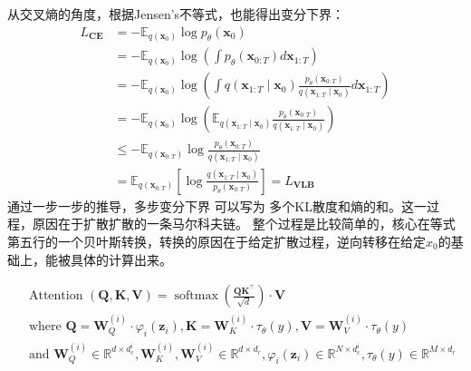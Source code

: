 从交叉熵的角度，根据Jensen's不等式，也能得出变分下界：
\begin{equation}
  \begin{aligned} L_{\mathbf{CE}}
    & =-\mathbb{E}_{q\left(\mathbf{x}_0\right)} \log p_\theta\left(\mathbf{x}_0\right) \\
    & =-\mathbb{E}_{q\left(\mathbf{x}_0\right)} \log \left(\int p_\theta\left(\mathbf{x}_{0: T}\right) d \mathbf{x}_{1: T}\right) \\
    & =-\mathbb{E}_{q\left(\mathbf{x}_0\right)} \log \left(\int q\left(\mathbf{x}_{1: T} \mid \mathbf{x}_0\right) \frac{p_\theta\left(\mathbf{x}_{0: T}\right)}{q\left(\mathbf{x}_{1: T} \mid \mathbf{x}_0\right)} d \mathbf{x}_{1: T}\right) \\
    & =-\mathbb{E}_{q\left(\mathbf{x}_0\right)} \log \left(\mathbb{E}_{q\left(\mathbf{x}_{1: T} \mid \mathbf{x}_0\right)} \frac{p_\theta\left(\mathbf{x}_{0: T}\right)}{q\left(\mathbf{x}_{1: T} \mid \mathbf{x}_0\right)}\right) \\
    & \leq-\mathbb{E}_{q\left(\mathbf{x}_{0: T}\right)} \log \frac{p_\theta\left(\mathbf{x}_{0: T}\right)}{q\left(\mathbf{x}_{1: T} \mid \mathbf{x}_0\right)} \\
    & =\mathbb{E}_{q\left(\mathbf{x}_{0: T}\right)}\left[\log \frac{q\left(\mathbf{x}_{1: T} \mid \mathbf{x}_0\right)}{p_\theta\left(\mathbf{x}_{0: T}\right)}\right]=L_{\mathbf{VLB}}
  \end{aligned}
\end{equation}
通过一步一步的推导，多步变分下界 可以写为 多个KL散度和熵的和。这一过程，原因在于扩散扩散的一条马尔科夫链。
整个过程是比较简单的，核心在等式第五行的一个贝叶斯转换，转换的原因在于给定扩散过程，逆向转移在给定$x_0$的基础上，能被具体的计算出来。

\begin{equation}
  \begin{aligned} &
    \text { Attention }(\mathbf{Q}, \mathbf{K}, \mathbf{V})=\operatorname{softmax}\left(\frac{\mathbf{Q K}^{\top}}{\sqrt{d}}\right) \cdot \mathbf{V} \\
    & \text { where } \mathbf{Q}=\mathbf{W}_Q^{(i)} \cdot \varphi_i\left(\mathbf{z}_i\right), \mathbf{K}=\mathbf{W}_K^{(i)} \cdot \tau_\theta(y), \mathbf{V}=\mathbf{W}_V^{(i)} \cdot \tau_\theta(y) \\
    & \text { and } \mathbf{W}_Q^{(i)} \in \mathbb{R}^{d \times d_e^i}, \mathbf{W}_K^{(i)}, \mathbf{W}_V^{(i)} \in \mathbb{R}^{d \times d_r}, \varphi_i\left(\mathbf{z}_i\right) \in \mathbb{R}^{N \times d_c^i}, \tau_\theta(y) \in \mathbb{R}^{M \times d_r}
  \end{aligned}
\end{equation}

